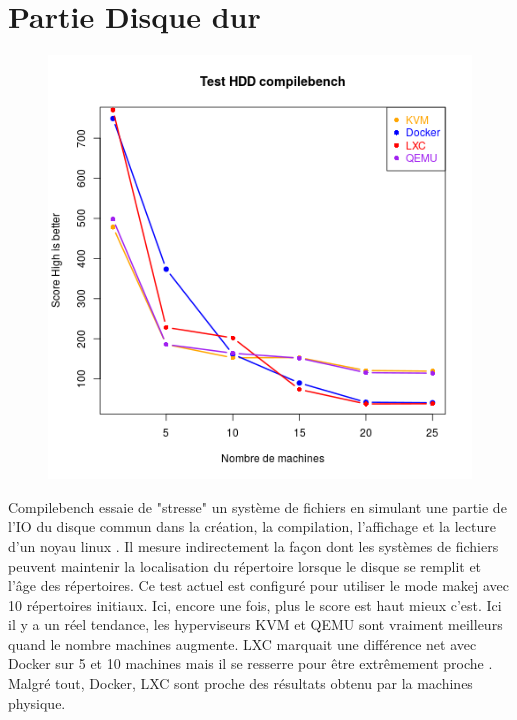 \section{Partie Disque dur }
\begin{figure}[!h]
\centering
\includegraphics[scale=0.8]{resultats/compilebench.png}
\end{figure}
Compilebench essaie de "stresse" un système de fichiers en simulant une partie de l'IO du disque commun dans la création, la compilation, l'affichage et la lecture d'un noyau linux . Il mesure indirectement la façon dont les systèmes de fichiers peuvent maintenir la localisation du répertoire lorsque le disque se remplit et l'âge des répertoires. Ce test actuel est configuré pour utiliser le mode makej avec 10 répertoires initiaux. Ici, encore une fois, plus le score est haut mieux c'est.
Ici il y a un réel tendance, les hyperviseurs KVM et QEMU sont vraiment meilleurs quand le nombre machines augmente. LXC marquait une différence net avec Docker sur 5 et 10 machines mais il se resserre pour être extrêmement proche .
Malgré tout, Docker, LXC sont proche des résultats obtenu par la machines physique.
\newpage
